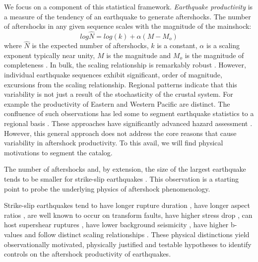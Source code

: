 \documentclass[12pt, notitlepage]{report}
\begin{document}
We focus on a component of this statistical framework. \textit{Earthquake productivity} is a measure of the tendency of an earthquake to generate aftershocks. The number of aftershocks in any given sequence scales with the magnitude of the mainshock:
\begin{equation}\label{eq:productivity}
    log\hat{N} = log(k)+\alpha(M-M_o)
\end{equation}
where $\hat{N}$ is the expected number of aftershocks, $k$ is a constant, $\alpha$ is a scaling exponent typically near unity, $M$ is the magnitude and $M_o$ is the magnitude of completeness \cite{deArcangelis2016StatisticalForecasting}. In bulk, the scaling relationship is remarkably robust \cite{deArcangelis2016StatisticalForecasting, Kisslinger2011AftershocksProperties,Tahir2015,Tahir2014Aftershock2005,Page}. However, individual earthquake sequences exhibit significant, order of magnitude, excursions from the scaling relationship.%
Regional patterns indicate that this variability is not just a result of the stochasticity of the crustal system. For example the productivity of Eastern and Western Pacific \cite{Singh1988Regionalle7.0, Wetzler2016} are distinct. The confluence of such observations has led some to segment earthquake statistics to a regional basis \cite{ChuComparisonZones, Page, Davidsen2015GeneralizedCalifornia, Tahir2014Aftershock2005, ogata2017statistics}. These approaches have significantly advanced hazard assessment \cite{Page, deArcangelis2016StatisticalForecasting, ogata2017statistics}. However, this general approach does not address the core reasons that cause variability in aftershock productivity. To this avail, we will find physical motivations to segment the catalog. 

The number of aftershocks and, by extension, the size of the largest earthquake tends to be smaller for strike-slip earthquakes \cite{Tahir2012,Tahir2014Aftershock2005,Tahir2015}. This observation is a starting point to probe the underlying physics of aftershock phenomenology. 

Strike-slip earthquakes tend to have longer rupture duration \cite{Houston2001InfluenceFunctions}, have longer aspect ratios \cite{Hayes2017}, are well known to occur on transform faults, have higher stress drop \cite{Allmann2009GlobalEarthquakes}, can host supershear ruptures \cite{Bouchon2008TheEarthquakes}, have lower background seismicity \cite{Tahir2015}, have higher b-values and follow distinct scaling relationships \cite{Scholz2019TheFaulting}. These physical distinctions yield observationally motivated, physically justified and testable hypotheses to identify controls on the aftershock productivity of earthquakes.
\end{document}
